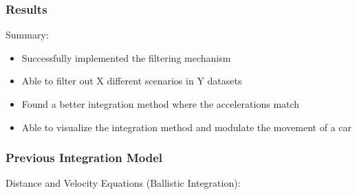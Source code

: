 \begin{frame}
  \frametitle{Results}
    Summary:
    \begin{itemize}[<+->]
      \item Successfully implemented the filtering mechanism
      \item Able to filter out X different scenarios in Y datasets
      \item Found a better integration method where the accelerations match
      \item Able to visualize the integration method and modulate the movement of a car
    \end{itemize}
\end{frame}


\begin{frame}
  \frametitle{Previous Integration Model }
    Distance and Velocity Equations (Ballistic Integration):
\end{frame}

